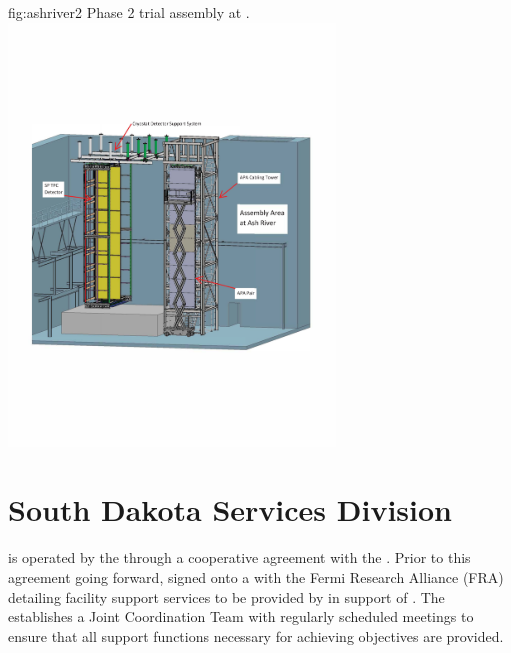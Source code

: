 \begin{dunefigure}{fig:ashriver2}
  {Phase 2 trial assembly at .}
  \includegraphics[width=0.65\textwidth]{graphics/Phase2_Trial_Assembly.pdf}
\end{dunefigure}

\section{South Dakota Services Division}
\label{sec:fdsp-coord-host_facility_services}

 is operated by the  through a cooperative 
agreement with the .  Prior to this agreement going forward, 
 signed onto a  with the Fermi Research Alliance 
(FRA) detailing facility support services to be provided by 
in support of .  The  establishes a Joint 
Coordination Team with regularly scheduled meetings to ensure that all  
 support functions necessary for achieving  
objectives are provided.             

